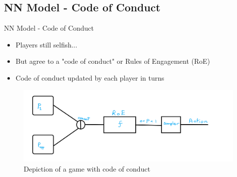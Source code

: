 \documentclass{IFES-beamer}
\begin{document}
    \subsection{NN Model - Code of Conduct}
        \begin{frame}{NN Model - Code of Conduct}
            \begin{itemize}
                \item Players still selfish...
                \item But agree to a "code of conduct" or Rules of Engagement (RoE)
                \item Code of conduct updated by each player in turns
            \end{itemize}
            \begin{figure}[H]
                \centering
                \includegraphics[scale=0.15]{Images/RoE.png}
                \caption{Depiction of a game with code of conduct}
            \end{figure}
        \end{frame}
\end{document}
